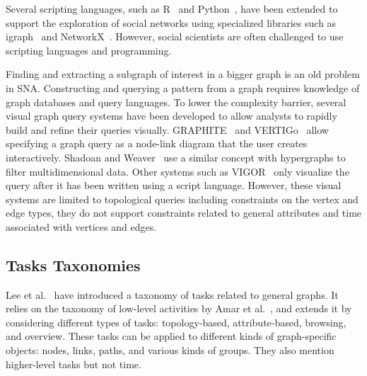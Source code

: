 Several scripting languages, such as R~\cite{RStat} and Python~\cite{Python}, have been extended to support the exploration of social networks using specialized libraries such as igraph~\cite{igraph} and NetworkX~\cite{NetworkX}. However, social scientists are often challenged to use scripting languages and programming.

Finding and extracting a subgraph of interest in a bigger graph
is an old problem in SNA. %
%
Constructing and querying a pattern from a graph requires knowledge of graph databases and query languages.
To lower the complexity barrier, several visual graph query systems have been developed to allow analysts to rapidly build and refine their queries visually. GRAPHITE~\cite{chau_graphite_2008} and VERTIGo~\cite{cuenca_vertigo_2021} allow specifying a graph query as a node-link diagram that the user creates interactively. Shadoan and Weaver~\cite{shadoan_visual_2013} use a similar concept with hypergraphs to filter multidimensional data. Other systems such as VIGOR~\cite{pienta_vigor_2018} only visualize the query after it has been written using a script language. However, these visual systems are limited to topological queries including constraints on the vertex and edge types, they do not support constraints related to general attributes and time associated with vertices and edges.

\iffalse
\subsection{Tasks Taxonomies}

Lee et al.~\cite{lee:hal-00851754} have introduced a taxonomy of tasks related to general graphs.
It relies on the taxonomy of low-level activities by Amar et al.~\cite{Amar05}, and extends it by considering different types of tasks: topology-based, attribute-based, browsing, and overview. These tasks can be applied to different kinds of graph-specific objects: nodes, links, paths, and various kinds of groups.
They also mention higher-level tasks but not time.

